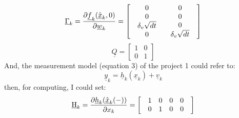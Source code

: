 \documentclass{article}
\begin{document}
\begin{equation}
	\underline{\Gamma}_k  = \frac{{\partial \underline{f}_k (\hat{\underline{x}}_k ,0)}}{{\partial \underline{w}_k }} = \left[ {\begin{array}{*{20}c}
	   {\begin{array}{*{20}c}
	   0  \\
	   0  \\
	   {\delta _v \sqrt {dt} }  \\
	   0  \\
	\end{array}} & {\begin{array}{*{20}c}
	   0  \\
	   0  \\
	   0  \\
	   {\delta _v \sqrt {dt} }  \\
	\end{array}}  \\
	\end{array}} \right]
\end{equation}
\begin{equation}
\underline{Q}=\left[ \begin{array}{cc}
1 & 0 \\ 
0 & 1
\end{array}\right]  
\end{equation}
And, the measurement model (equation 3) of the project 1 could refer to:
\begin{equation}
	\underline{y}_k = \underline{h}_k(\underline{x}_k) + \underline{v}_k
\end{equation}
then, for computing, I could set:
\begin{equation}
	\underline{{\rm H}}_k  = \frac{{\partial \underline{h}_k (\hat{\underline{x}}_k (-))}}{{\partial x_k }} = \left[ {\begin{array}{*{20}c}
	   {\begin{array}{*{20}c}
	   1 & 0 & 0 & 0  \\
	\end{array}}  \\
	   {\begin{array}{*{20}c}
	   0 & 1 & 0 & 0  \\
	\end{array}}  \\
	\end{array}} \right]
\end{equation}
\end{document}
